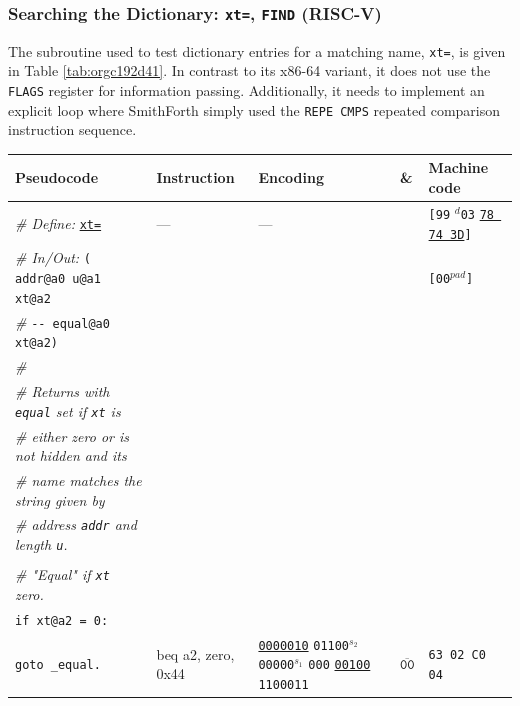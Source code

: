 \documentclass[a4paper,12pt,final]{article}
\begin{document}
\subsubsection{Searching the Dictionary: \texttt{xt=}, \texttt{FIND} (RISC-V)}
\label{sec:orgc547ab8}

The subroutine used to test dictionary entries for a matching name,
\texttt{xt=}, is given in Table \ref{tab:orgc192d41}.  In contrast to its x86-64
variant, it does not use the \texttt{FLAGS} register for information passing.
Additionally, it needs to implement an explicit loop where SmithForth
simply used the \texttt{REPE CMPS} repeated comparison instruction sequence.

\begin{table}[!htbp] \begin{adjustwidth}{-1cm}{-1cm} \fontsize{8}{9.600000}\selectfont
\begin{center}
\begin{tabular}{l|ll|l|l}
\textbf{Pseudocode} & \textbf{Instruction} & \textbf{Encoding} & \textbf{\&} & \textbf{Machine code}\\[0pt]
\hline
\emph{\# Define:} \uline{\texttt{xt=}} & --- & --- &  & \texttt{[99} \(^{d}\)​\texttt{03} \uline{\texttt{78 74 3D}}​\texttt{]}\\[0pt]
\emph{\# In/Out:}    \texttt{( addr@a0 u@a1 xt@a2} &  &  &  & \texttt{[00}​\(^{pad}\)​\texttt{]}\\[0pt]
\emph{\#}\hspace{3.35em} \texttt{-{}-{} equal@a0     xt@a2)} &  &  &  & \\[0pt]
\emph{\#} &  &  &  & \\[0pt]
\emph{\# Returns with \texttt{equal} set if \texttt{xt} is} &  &  &  & \\[0pt]
\emph{\# either zero or is not hidden and its} &  &  &  & \\[0pt]
\emph{\# name matches the string given by} &  &  &  & \\[0pt]
\emph{\# address \texttt{addr} and length \texttt{u}.} &  &  &  & \\[0pt]
 &  &  &  & \\[0pt]
\hspace{1.053000em} \emph{\# "Equal" if \texttt{xt} zero.} &  &  &  & \\[0pt]
\hspace{1.053000em} \texttt{if xt@a2 = 0:} &  &  &  & \\[0pt]
\hspace{2.106000em}   \texttt{goto \_equal.} & beq a2, zero, 0x44 & \uline{\texttt{0000010}} \texttt{01100}​\(^{s_{2}}\) \texttt{00000}​\(^{s_{1}}\) \texttt{000} \uline{\texttt{00100}} \texttt{1100011} & \(\overline{\texttt{00}}\) & \texttt{63 02 C0 04}\\[0pt]

\end{tabular}
\end{center}
\end{adjustwidth}
\end{table}
\end{document}
